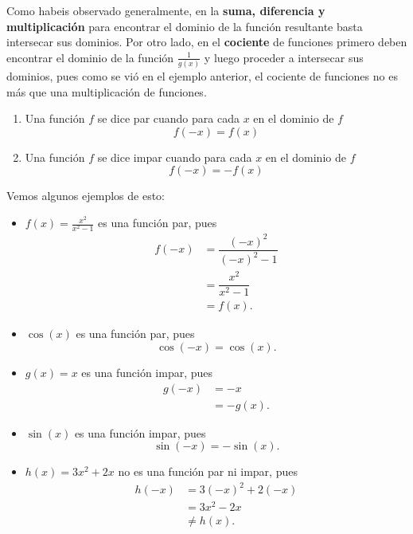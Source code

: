 Como habeis observado generalmente, en la \textbf{suma, diferencia y multiplicaci\'on} para encontrar el dominio de la funci\'on resultante basta intersecar sus dominios. Por otro lado, en el \textbf{cociente} de funciones primero deben encontrar el dominio de la funci\'on \(\frac{1}{g(x)}\) y luego proceder a intersecar sus dominios, pues como se vi\'o en el ejemplo anterior, el cociente de funciones no es m\'as que una multiplicaci\'on de funciones.\newline

\begin{definition*}

\begin{enumerate}
\item Una funci\'on \(f\) se dice par cuando para cada \(x\) en el dominio de \(f\)
	\[
	f(-x)=f(x)
	\]

\item Una funci\'on \(f\) se dice impar cuando para cada \(x\) en el dominio de \(f\)
	\[
		f(-x)=-f(x)
	\]
\end{enumerate}

\end{definition*}


Vemos algunos ejemplos de esto:

\begin{itemize}
	\item \(f(x)=\frac{x^2}{x^2-1}\) es una funci\'on par, pues
	\begin{align*}
	f(-x)&=\dfrac{(-x)^2}{(-x)^2-1}\\
	&=\dfrac{x^2}{x^2-1}\\
	&=f(x).
	\end{align*}
	
	\item \(\cos(x)\) es una funci\'on par, pues
	\[\cos(-x)=\cos(x).\]
	
	\item \(g(x)=x\) es una funci\'on impar, pues
	\begin{align*}
	g(-x)&=-x\\
	&=-g(x).
	\end{align*}
	
	\item \(\sin(x)\) es una funci\'on impar, pues
		\[\sin(-x)=-\sin(x).\]$  $
	
	\item \(h(x)=3x^2+2x\) no es una funci\'on par ni impar, pues
	\begin{align*}
	h(-x)&=3(-x)^2+2(-x)\\
	&=3x^2-2x\\
	&\neq h(x).
	\end{align*}
\end{itemize}


